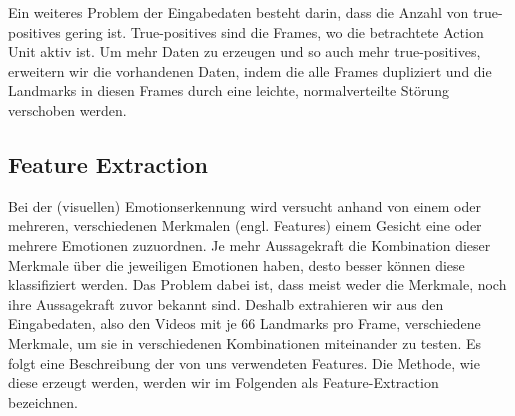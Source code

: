 Ein weiteres Problem der Eingabedaten besteht darin, dass die Anzahl von true-positives gering ist. True-positives sind die Frames, wo die betrachtete Action Unit aktiv ist.
Um mehr Daten zu erzeugen und so auch mehr true-positives, erweitern wir die vorhandenen Daten, indem die alle Frames dupliziert
und die Landmarks in diesen Frames durch eine leichte, normalverteilte Störung verschoben werden.


\subsection{Feature Extraction}
Bei der (visuellen) Emotionserkennung wird versucht anhand von einem oder mehreren, verschiedenen Merkmalen (engl. Features)
einem Gesicht eine oder mehrere Emotionen zuzuordnen. Je mehr Aussagekraft die Kombination dieser Merkmale über die jeweiligen Emotionen haben,
desto besser können diese klassifiziert werden. Das Problem dabei ist, dass meist weder die Merkmale, noch
ihre Aussagekraft zuvor bekannt sind. Deshalb extrahieren wir aus den Eingabedaten, also den Videos mit je 66 Landmarks pro
Frame, verschiedene Merkmale, um sie in verschiedenen Kombinationen miteinander zu testen. Es folgt eine Beschreibung
der von uns verwendeten Features. Die Methode, wie diese erzeugt werden, werden wir im Folgenden als Feature-Extraction bezeichnen.


